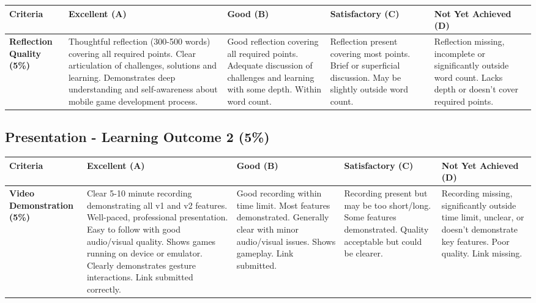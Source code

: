 \documentclass{article}
\begin{document}
\begin{landscape}
\begin{tabular}{|p{5cm}|p{4cm}|p{4cm}|p{4cm}|p{4cm}|}
\hline
\textbf{Criteria} & \textbf{Excellent (A)} & \textbf{Good (B)} & \textbf{Satisfactory (C)} & \textbf{Not Yet Achieved (D)} \\ \hline

\textbf{Reflection Quality (5\%)} & 
Thoughtful reflection (300-500 words) covering all required points. Clear articulation of challenges, solutions and learning. Demonstrates deep understanding and self-awareness about mobile game development process. & 
Good reflection covering all required points. Adequate discussion of challenges and learning with some depth. Within word count. & 
Reflection present covering most points. Brief or superficial discussion. May be slightly outside word count. & 
Reflection missing, incomplete or significantly outside word count. Lacks depth or doesn't cover required points. \\ \hline

\end{tabular}

\subsection*{Presentation - Learning Outcome 2 (5\%)}

\begin{tabular}{|p{5cm}|p{4cm}|p{4cm}|p{4cm}|p{4cm}|}
\hline
\textbf{Criteria} & \textbf{Excellent (A)} & \textbf{Good (B)} & \textbf{Satisfactory (C)} & \textbf{Not Yet Achieved (D)} \\ \hline

\textbf{Video Demonstration (5\%)} & 
Clear 5-10 minute recording demonstrating all v1 and v2 features. Well-paced, professional presentation. Easy to follow with good audio/visual quality. Shows games running on device or emulator. Clearly demonstrates gesture interactions. Link submitted correctly. & 
Good recording within time limit. Most features demonstrated. Generally clear with minor audio/visual issues. Shows gameplay. Link submitted. & 
Recording present but may be too short/long. Some features demonstrated. Quality acceptable but could be clearer. & 
Recording missing, significantly outside time limit, unclear, or doesn't demonstrate key features. Poor quality. Link missing. \\ \hline

\end{tabular}

\restoregeometry
\end{landscape}
\end{document}
